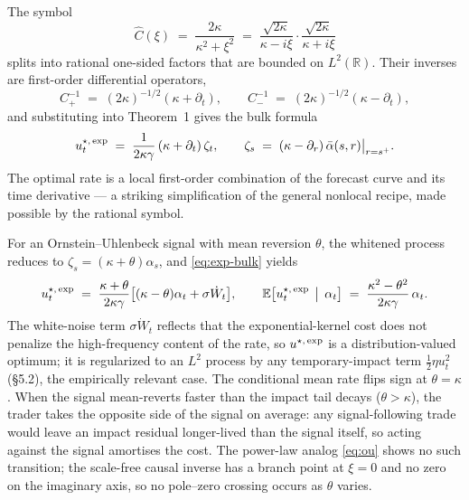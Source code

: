 \documentclass[11pt]{article}
\newcommand{\R}{\mathbb{R}}
\newcommand{\E}{\mathbb{E}}
\theoremstyle{plain}
\begin{document}
The symbol
\[
\hat C(\xi) \;=\; \frac{2\kappa}{\kappa^2+\xi^2} \;=\; \frac{\sqrt{2\kappa}}{\kappa-i\xi}\cdot\frac{\sqrt{2\kappa}}{\kappa+i\xi}
\]
splits into rational one-sided factors that are bounded on $L^2(\R)$. Their inverses are first-order differential operators,
\[
C_+^{-1} \;=\; (2\kappa)^{-1/2}(\kappa+\partial_t), \qquad C_-^{-1} \;=\; (2\kappa)^{-1/2}(\kappa-\partial_t),
\]
and substituting into Theorem~1 gives the bulk formula
\begin{equation}\label{eq:exp-bulk}
u^{\star,\,\rm exp}_t \;=\; \frac{1}{2\kappa\gamma}\,(\kappa+\partial_t)\,\zeta_t, \qquad \zeta_s \;=\; (\kappa-\partial_r)\,\bar\alpha(s,r)\bigl|_{r=s^+}.
\end{equation}
The optimal rate is a local first-order combination of the forecast curve and its time derivative --- a striking simplification of the general nonlocal recipe, made possible by the rational symbol.

For an Ornstein--Uhlenbeck signal with mean reversion $\theta$, the whitened process reduces to $\zeta_s = (\kappa+\theta)\alpha_s$, and \eqref{eq:exp-bulk} yields
\begin{equation}\label{eq:exp-ou}
u^{\star,\,\rm exp}_t \;=\; \frac{\kappa+\theta}{2\kappa\gamma}\bigl[(\kappa-\theta)\alpha_t + \sigma\dot W_t\bigr], \qquad \E\bigl[u^{\star,\,\rm exp}_t\,\bigm|\,\alpha_t\bigr] \;=\; \frac{\kappa^2-\theta^2}{2\kappa\gamma}\,\alpha_t.
\end{equation}
The white-noise term $\sigma\dot W_t$ reflects that the exponential-kernel cost does not penalize the high-frequency content of the rate, so $u^{\star,\,\rm exp}$ is a distribution-valued optimum; it is regularized to an $L^2$ process by any temporary-impact term $\tfrac12\eta u_t^2$ (\S5.2), the empirically relevant case.
The conditional mean rate flips sign at $\theta = \kappa$. When the signal mean-reverts faster than the impact tail decays ($\theta>\kappa$), the trader takes the opposite side of the signal on average: any signal-following trade would leave an impact residual longer-lived than the signal itself, so acting against the signal amortises the cost. The power-law analog \eqref{eq:ou} shows no such transition; the scale-free causal inverse has a branch point at $\xi=0$ and no zero on the imaginary axis, so no pole--zero crossing occurs as $\theta$ varies.
\end{document}
